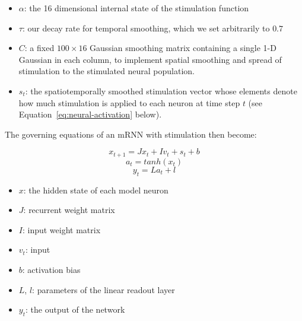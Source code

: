 \documentclass[12pt]{iopart}
\begin{document}
\begin{itemize}
	\item $\alpha$: the 16 dimensional internal state 
        of the stimulation function
	\item $\tau$: our decay rate for temporal smoothing, which we set arbitrarily to $0.7$
	\item $C$: a fixed $100 \times 16$ Gaussian smoothing matrix containing a single 1-D Gaussian
	           in each column, to implement spatial smoothing and spread of stimulation to the
	           stimulated neural population. 
	\item $s_{t}$: the spatiotemporally smoothed stimulation vector whose elements denote how
	               much stimulation is applied to each neuron at time step $t$ (see
	               Equation~\ref{eq:neural-activation} below).
\end{itemize}

The governing equations of an mRNN with stimulation then become:

\begin{equation}
x_{t+1} = Jx_{t} + Iv_{t} + s_{t} + b
\label{eq:neural-activation}
\end{equation}
\begin{equation}
a_{t} = tanh(x_{t})
\end{equation}
\begin{equation}
y_{t} = La_{t} + l
\end{equation}

\begin{itemize}
	\item $x$: the hidden state of each model neuron
	\item $J$: recurrent weight matrix
	\item $I$: input weight matrix
    \item $v_{t}$: input 
	\item $b$: activation bias
	\item $L$, $l$: parameters of the linear readout layer
	\item $y_{t}$: the output of the network
\end{itemize}
\end{document}
